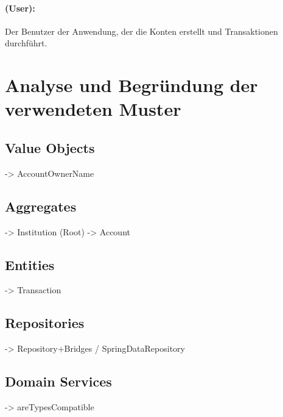 \paragraph*{ (User):} Der Benutzer der Anwendung, der die Konten erstellt und Transaktionen durchführt.



\section{Analyse und Begründung der verwendeten Muster}
\subsection*{Value Objects}
-> AccountOwnerName
\subsection*{Aggregates}
-> Institution (Root) 
-> Account
\subsection*{Entities}
-> Transaction
\subsection*{Repositories}
-> Repository+Bridges / SpringDataRepository
\subsection*{Domain Services}
-> areTypesCompatible
